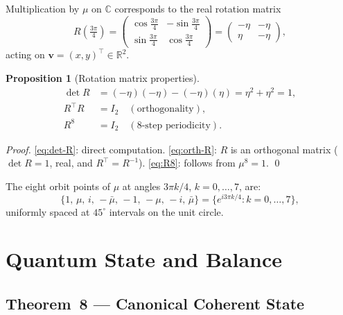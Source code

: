\documentclass[12pt,a4paper]{article}
\theoremstyle{plain}
\newtheorem{proposition}[theorem]{Proposition}
\theoremstyle{definition}
\theoremstyle{remark}
\newcommand{\C}{\mathbb{C}}
\newcommand{\R}{\mathbb{R}}
\begin{document}
Multiplication by $\mu$ on $\C$ corresponds to the real rotation matrix
\begin{equation}
  R\!\left(\tfrac{3\pi}{4}\right)
  =
  \begin{pmatrix}
    \cos\tfrac{3\pi}{4} & -\sin\tfrac{3\pi}{4}\\[4pt]
    \sin\tfrac{3\pi}{4} &  \cos\tfrac{3\pi}{4}
  \end{pmatrix}
  =
  \begin{pmatrix} -\eta & -\eta \\ \eta & -\eta \end{pmatrix},
  \label{eq:rot-matrix}
\end{equation}
acting on $\mathbf{v} = (x,y)^\top \in \R^2$.

\begin{proposition}[Rotation matrix properties]\label{prop:rot}
  \begin{align}
    \det R &= (-\eta)(-\eta) - (-\eta)(\eta) = \eta^2+\eta^2 = 1,
      \label{eq:det-R}\\
    R^\top R &= I_2 \quad(\text{orthogonality}),
      \label{eq:orth-R}\\
    R^8 &= I_2 \quad(\text{8-step periodicity}).
      \label{eq:R8}
  \end{align}
\end{proposition}

\begin{proof}
  \eqref{eq:det-R}: direct computation.
  \eqref{eq:orth-R}: $R$ is an orthogonal matrix ($\det R = 1$, real, and
  $R^\top = R^{-1}$).
  \eqref{eq:R8}: follows from $\mu^8 = 1$. \qed
\end{proof}

The eight orbit points of $\mu$ at angles $3\pi k/4$, $k=0,\ldots,7$, are:
\begin{equation}
  \{1,\, \mu,\, i,\, -\bar\mu,\, -1,\, -\mu,\, -i,\, \bar\mu\}
  = \bigl\{e^{i3\pi k/4} : k=0,\ldots,7\bigr\},
  \label{eq:orbit8}
\end{equation}
uniformly spaced at $45^\circ$ intervals on the unit circle.

\section{Quantum State and Balance}
\label{sec:state}

\subsection{Theorem~8 — Canonical Coherent State}
\end{document}
